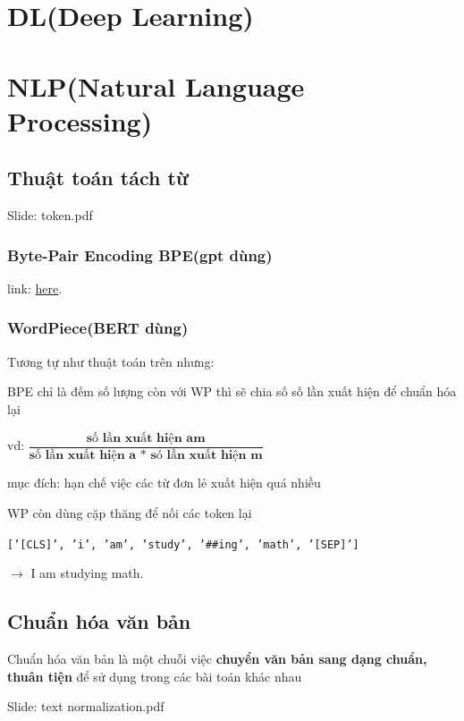 \documentclass[final,letterpaper,twoside,12pt]{report}
\begin{document}
\part{DL(Deep Learning)}
\setcounter{chapter}{0}

\part{NLP(Natural Language Processing)}
\setcounter{chapter}{0}

\chapter{Thuật toán tách từ}

Slide: token.pdf

\section{Byte-Pair Encoding BPE(gpt dùng)}

link: \href{https://protonx.io/news/chi-tiet-thuat-toan-tach-token-byte-pair-encoding-bpe-1702295274898}{here}.

\section{WordPiece(BERT dùng)}

Tương tự như thuật toán trên nhưng:

BPE chỉ là đếm số lượng còn với WP thì sẽ chia số số lần xuất hiện để chuẩn hóa lại

vd:  $\dfrac{\textbf{số lần xuất hiện am}}{\textbf{số lần xuất hiện a * só lần xuất hiện m}}$

mục đích: hạn chế việc các từ đơn lẻ xuất hiện quá nhiều

WP còn dùng cặp thăng để nối các token lại

\texttt{['[CLS]', 'i', 'am', 'study', '\#\#ing', 'math', '[SEP]']}

$\longrightarrow$ I am studying math.

\chapter{Chuẩn hóa văn bản}

Chuẩn hóa văn bản là một chuỗi việc \textbf{chuyển văn bản sang dạng chuẩn, thuân tiện }để sử dụng trong các bài toán khác nhau

Slide: text normalization.pdf
\end{document}
